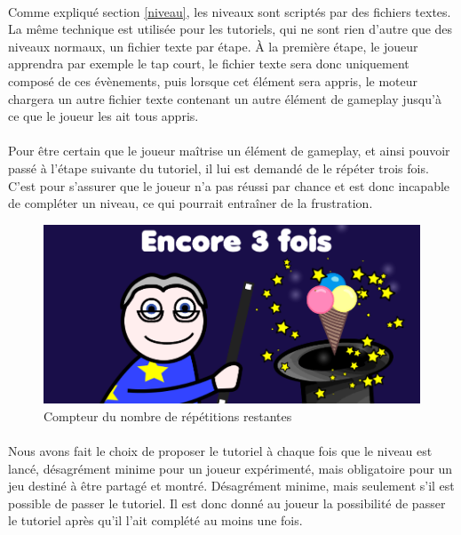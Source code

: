 \paragraph{}
Comme expliqué section \ref{niveau}, les niveaux sont scriptés par des fichiers textes. La même technique est utilisée pour les tutoriels, qui ne sont rien d'autre que des niveaux normaux, un fichier texte par étape. À la première étape, le joueur apprendra par exemple le tap court, le fichier texte sera donc uniquement composé de ces évènements, puis lorsque cet élément sera appris, le moteur chargera un autre fichier texte contenant un autre élément de gameplay jusqu'à ce que le joueur les ait tous appris.

\paragraph{}
Pour être certain que le joueur maîtrise un élément de gameplay, et ainsi pouvoir passé à l'étape suivante du tutoriel, il lui est demandé de le répéter trois fois. C'est pour s'assurer que le joueur n'a pas réussi par chance et est donc incapable de compléter un niveau, ce qui pourrait entraîner de la frustration.


\begin{figure}[H]\centering
  \includegraphics[scale=0.28]{./img/compteur_tuto.png}
  \caption{Compteur du nombre de répétitions restantes}
  \label{repetitions}
\end{figure}

\paragraph{}
Nous avons fait le choix de proposer le tutoriel à chaque fois que le niveau est lancé, désagrément minime pour un joueur expérimenté, mais obligatoire pour un jeu destiné à être partagé et montré. Désagrément minime, mais seulement s'il est possible de passer le tutoriel. Il est donc donné au joueur la possibilité de passer le tutoriel après qu'il l'ait complété au moins une fois.

